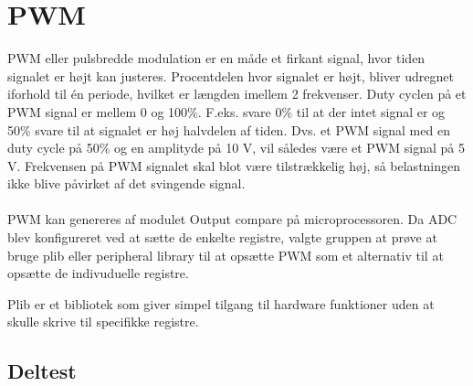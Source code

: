 \section{PWM}
PWM eller pulsbredde modulation er en måde et firkant signal, hvor tiden signalet er højt kan justeres. Procentdelen hvor signalet er højt, bliver udregnet iforhold til én periode, hvilket er længden imellem 2 frekvenser. Duty cyclen på et PWM signal er mellem 0 og 100\%. F.eks. svare 0\% til at der intet signal er og 50\% svare til at signalet er høj halvdelen af tiden. Dvs. et PWM signal med en duty cycle på 50\% og en amplityde på 10 V, vil således være et PWM signal på 5 V. Frekvensen på PWM signalet skal blot være tilstrækkelig høj, så belastningen ikke blive påvirket af det svingende signal. 
\\
\\
PWM kan genereres af modulet Output compare på microprocessoren. Da ADC blev konfigureret ved at sætte de enkelte registre, valgte gruppen at prøve at bruge plib eller peripheral library til at opsætte PWM som et alternativ til at opsætte de indivuduelle registre.

Plib er et bibliotek som giver simpel tilgang til hardware funktioner uden at skulle skrive til specifikke registre.









\subsection{Deltest}